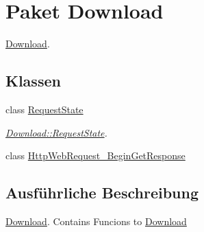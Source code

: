 \hypertarget{namespace_download}{\section{Paket Download}
\label{namespace_download}
}


\hyperlink{namespace_download}{Download}.  


\subsection*{Klassen}
\begin{DoxyCompactItemize}
\item 
class \hyperlink{class_download_1_1_request_state}{Request\-State}
\begin{DoxyCompactList}\small\item\em \hyperlink{class_download_1_1_request_state}{Download\-::\-Request\-State}. \end{DoxyCompactList}\item 
class \hyperlink{class_download_1_1_http_web_request___begin_get_response}{Http\-Web\-Request\-\_\-\-Begin\-Get\-Response}
\end{DoxyCompactItemize}


\subsection{Ausführliche Beschreibung}
\hyperlink{namespace_download}{Download}. Contains Funcions to \hyperlink{namespace_download}{Download} 